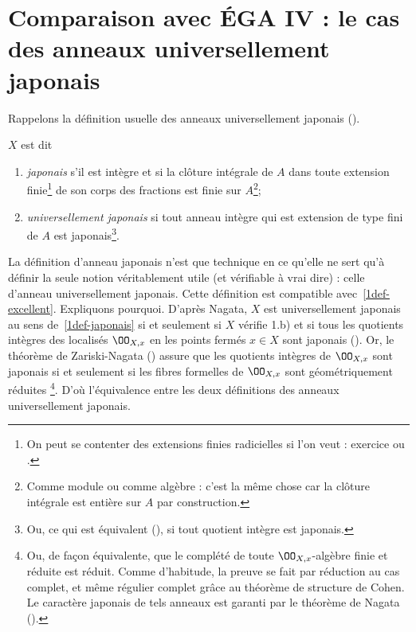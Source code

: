 \documentclass[10pt]{../fichiers-configuration-latex/smfart}
\begin{document}
\section{Comparaison avec ÉGA IV : le cas des anneaux universellement japonais}

Rappelons la définition usuelle des anneaux universellement japonais ().

\begin{definition}\label{1def-japonais} $X$  est dit \begin{enumerate} \item \emph{japonais} s'il
est intègre et si la clôture intégrale de $A$ dans toute extension finie\footnote{On peut se
contenter des extensions finies radicielles si l'on veut : exercice ou .} de son
corps des fractions est finie sur $A$\footnote{Comme module ou comme algèbre : c'est la même chose
car la clôture intégrale est entière sur $A$ par construction.}; \item \emph{universellement
japonais} si tout anneau intègre qui est extension de type fini de $A$ est japonais\footnote{Ou, ce
qui est équivalent (), si tout quotient intègre est japonais.}.  \end{enumerate}
\end{definition}


La définition d'anneau japonais n'est que technique en ce qu'elle ne sert qu'à définir la seule
notion véritablement utile (et vérifiable à vrai dire) : celle d'anneau universellement japonais.
Cette définition est compatible avec~\ref{1def-excellent}. Expliquons pourquoi. D'après Nagata, $X$
est universellement japonais au sens de~\ref{1def-japonais} si et seulement si $X$ vérifie 1.b) et
si tous les quotients intègres des localisés $\OO_{X,x}$ en les points fermés $x\in X$ sont japonais
().  Or, le théorème de Zariski-Nagata () assure  que les
quotients intègres de $\OO_{X,x}$ sont japonais si et seulement si les fibres formelles de
$\OO_{X,x}$  sont géométriquement réduites \footnote{\label{1Zar-Nag}Ou, de façon équivalente, que
le complété de toute $\OO_{X,x}$-algèbre finie et réduite est réduit. Comme d'habitude, la preuve se
fait par réduction au cas complet, et même régulier complet grâce au théorème de structure de Cohen.
Le caractère japonais de tels anneaux est garanti par le théorème de Nagata
().}. D'où l'équivalence entre les deux définitions des anneaux
universellement japonais.
\end{document}
